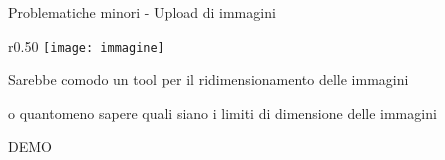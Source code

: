 \begin{frame}{Problematiche minori - Upload di immagini}
  \begin{wrapfigure}{r}{0.50\textwidth}
    \centering
    \texttt{[image: immagine]}
  \end{wrapfigure}
  Sarebbe comodo un tool per il ridimensionamento delle immagini

  o quantomeno sapere quali siano i limiti di dimensione delle immagini
\end{frame}
{
\begin{frame}[standout]
  \huge
  DEMO

\end{frame}
}
